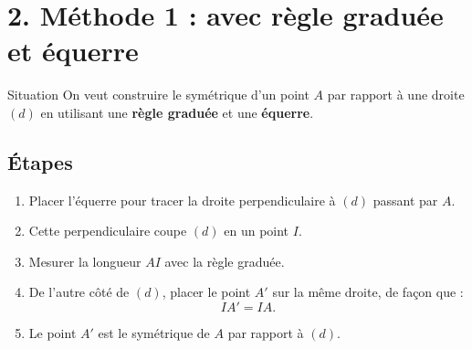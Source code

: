 \documentclass[11pt,a4paper]{article}
\begin{document}
\begin{center}
\end{center}

\section*{2. Méthode 1 : avec règle graduée et équerre}

\begin{boite}{Situation}
On veut construire le symétrique d'un point $A$ par rapport à une droite $(d)$ en utilisant une \textbf{règle graduée} et une \textbf{équerre}.
\end{boite}

\subsection*{Étapes}

\begin{enumerate}[label=\textbf{Étape \arabic* :}]
    \item Placer l'équerre pour tracer la droite perpendiculaire à $(d)$ passant par $A$.
    \item Cette perpendiculaire coupe $(d)$ en un point $I$.
    \item Mesurer la longueur $AI$ avec la règle graduée.
    \item De l'autre côté de $(d)$, placer le point $A'$ sur la même droite, de façon que :
    \[
    IA'=IA.
    \]
    \item Le point $A'$ est le symétrique de $A$ par rapport à $(d)$.
\end{enumerate}
\end{document}
